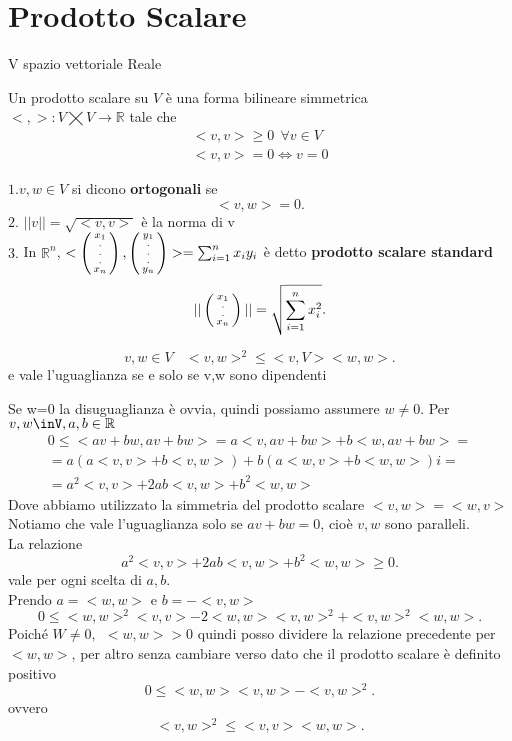 \documentclass[12px]{article}
\begin{document}
\section{Prodotto Scalare}
V spazio vettoriale Reale
\begin{defi}
	Un prodotto scalare su $V$ è una forma bilineare simmetrica \\$< , >: V\bigtimes V \rightarrow \mathbb{R}$ tale che \\
	\begin{gather*}
		<v,v> \geq 0 \ \ \forall v\in V\\
		<v,v> = 0 \Leftrightarrow v=0
	\end{gather*}
\end{defi}
\begin{nome}
	$1. v,w\in V$ si dicono \textbf{ortogonali} se \[
	<v,w> = 0
	.\] 
	$2.$ $|| v || = \sqrt{<v,v>}$ è la norma di v\\
	$3.$ In $\mathbb{R}^n$, $<\left(\begin{smallmatrix}x_1\\.\\.\\.\\x_n\end{smallmatrix}\right),\left(\begin{smallmatrix}y_1\\.\\.\\.\\y_n\end{smallmatrix}\right)> = \sum^n_{i=1}x_iy_i$
	è detto \textbf{prodotto scalare standard}
	\[
		||\left(\begin{smallmatrix}x_1\\.\\.\\x_n\end{smallmatrix}\right)|| = \sqrt{\sum^n_{i=1}x_i^2}
	.\] 
\end{nome}
\newpage
\begin{prop}
\[v,w\in V \ \ \ \ <v,w>^2 \leq <v,V><w,w>.\]
e vale l'uguaglianza se e solo se v,w sono dipendenti
\end{prop}
\begin{dimo}
	Se w=0 la disuguaglianza è ovvia, quindi possiamo assumere $w\neq 0$. Per $v,w\inV, a,b\in\R$
	\begin{gather*}
	0\leq <av + bw, av + bw> = a<v,av + bw> + b<w,av + bw> =\\
	= a(a<v,v> + b<v,w>) + b(a<w,v> + b<w,w>)i =\\
	= a^2<v,v> + 2ab <v,w> + b^2 <w,w>
\end{gather*} 
Dove abbiamo utilizzato la simmetria del prodotto scalare $<v,w> = <w,v>$\\
Notiamo che vale l'uguaglianza solo se $av + bw = 0$, cioè $v,w$ sono paralleli.\\
La relazione
\[
a^2<v,v> + 2ab <v,w> + b^2 <w,w> \geq 0
.\] 
vale per ogni scelta di $a,b$. \\
Prendo $a = <w,w>$ e $b = -<v,w>$\\
\[
0\leq <w,w>^2<v,v>-2<w,w><v,w>^2 + <v,w>^2<w,w>
.\]
Poiché $W \neq 0, \ \ <w,w> > 0$ quindi posso dividere la relazione precedente per $< w,w>$, per altro senza cambiare verso dato che il prodotto scalare è definito positivo
\[
0\leq <w,w><v,w> - <v,w>^2
.\] 
ovvero \[
<v,w>^2 \leq <v,v><w,w>
.\] 
\end{dimo} \\
\end{document}
